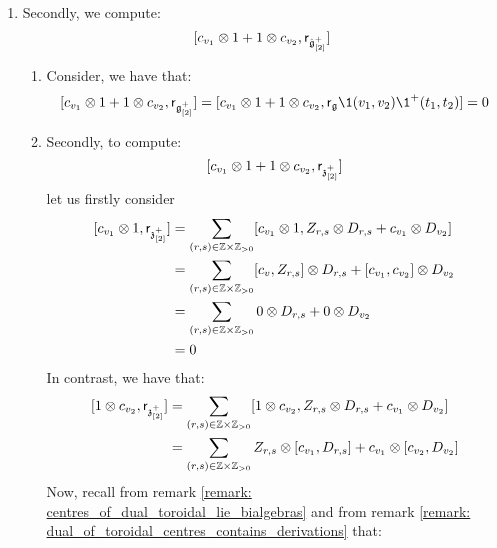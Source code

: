 \begin{remark}
\begin{enumerate}
\begin{enumerate}
                        \item Secondly, we compute:
                            $$[c_{v_1} \tensor 1 + 1 \tensor c_{v_2}, \sfr_{\hat{\g}_{[2]}^+}]$$
                        \begin{enumerate}
                            \item Consider, we have that:
                                $$[c_{v_1} \tensor 1 + 1 \tensor c_{v_2}, \sfr_{\g_{[2]}^+}] = [c_{v_1} \tensor 1 + 1 \tensor c_{v_2}, \sfr_{\g} \1(v_1, v_2) \1^+(t_1, t_2)] = 0$$
                            \item Secondly, to compute:
                                $$[c_{v_1} \tensor 1 + 1 \tensor c_{v_2}, \sfr_{\z_{[2]}^+}]$$
                            let us firstly consider 
                                $$
                                    \begin{aligned}
                                         [c_{v_1} \tensor 1, \sfr_{\z_{[2]}^+}] & = \sum_{(r, s) \in \Z \x \Z_{> 0}} [c_{v_1} \tensor 1, Z_{r, s} \tensor D_{r, s} + c_{v_1} \tensor D_{v_2}]
                                         \\
                                         & = \sum_{(r, s) \in \Z \x \Z_{> 0}} [c_v, Z_{r, s}] \tensor D_{r, s} + [c_{v_1}, c_{v_2}] \tensor D_{v_2}
                                         \\
                                         & = \sum_{(r, s) \in \Z \x \Z_{> 0}} 0 \tensor D_{r, s} + 0 \tensor D_{v_2}
                                         \\
                                         & = 0
                                    \end{aligned}
                                $$
                            In contrast, we have that:
                                $$
                                    \begin{aligned}
                                         [1 \tensor c_{v_2}, \sfr_{\z_{[2]}^+}] & = \sum_{(r, s) \in \Z \x \Z_{> 0}} [1 \tensor c_{v_2}, Z_{r, s} \tensor D_{r, s} + c_{v_1} \tensor D_{v_2}]
                                         \\
                                         & = \sum_{(r, s) \in \Z \x \Z_{> 0}} Z_{r, s} \tensor [c_{v_1}, D_{r, s}] + c_{v_1} \tensor [c_{v_2}, D_{v_2}]
                                    \end{aligned}
                                $$
                            Now, recall from remark \ref{remark: centres_of_dual_toroidal_lie_bialgebras} and from remark \ref{remark: dual_of_toroidal_centres_contains_derivations} that:

\end{enumerate}
\end{enumerate}
\end{enumerate}
\end{remark}
